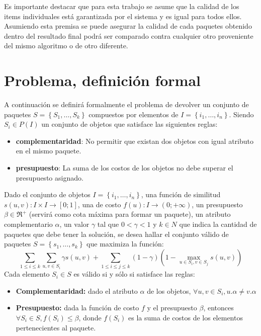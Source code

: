 Es importante destacar que para esta trabajo se asume que la calidad de los items individuales está garantizada por el sistema y es igual para todos ellos. Asumiendo esta premisa se puede asegurar la calidad de cada paquetes obtenido dentro del resultado final podrá ser comparado contra cualquier otro proveniente del mismo algoritmo o de otro diferente.

\section{Problema, definición formal}
A continuación se definirá formalmente el problema de devolver un conjunto de paquetes $S = \left\{S_1, \ldots, S_k\right\}$ compuestos por elementos de $I=\left\{i_1,\ldots, i_n\right\}$. Siendo $S_i \in P(I)$ un conjunto de objetos que satisface las siguientes reglas:
\begin{itemize}
\item \textbf{complementaridad}:  No permitir que existan dos objetos con igual atributo en el mismo paquete.
	\item \textbf{presupuesto}: La suma de los costos de los objetos no debe superar el presupuesto asignado.
\end{itemize}

Dado el conjunto de objetos $I=\left\{i_1,\ldots, i_n\right\}$, una función de similitud $s(u,v): I \times I \rightarrow [0;1]$, una de costo $f(u): I \rightarrow (0;+\infty)$, un presupuesto $\beta \in \Re^{+}$ (servirá como cota máxima para formar un paquete), un atributo complementario $\alpha$, un valor $\gamma$ tal que $0 < \gamma < 1$ y $k \in N$ que indica la cantidad de paquetes que debe tener la solución, se desea hallar el conjunto válido de paquetes $S = \left\{s_1, \ldots, s_k\right\}$ que maximiza la función:
\begin{equation} \label{des:eq-fnObj}
\sum_{1 \leq i \leq k}{\sum_{u,v \in S_i}{\gamma s(u,v)}} + \sum_{1 \leq i \leq j \leq k}{(1-\gamma) (1-\max_{u \in S_i, v \in S_j}{s(u,v)})}
\end{equation}
Cada elemento $S_i \in S$ es válido si y sólo si satisface las reglas:
\begin{itemize}
	\item \textbf{Complementaridad:} dado el atributo $\alpha$ de los objetos, $\forall u,v \in S_i, u.\alpha \neq v.\alpha$
	\item \textbf{Presupuesto:} dada la función de costo $f$ y el presupuesto $\beta$, entonces $\forall S_i \in S, f(S_i) \leq \beta$, donde $f(S_i)$ es la suma de costos de los elementos pertenecientes al paquete.
\end{itemize}		  

